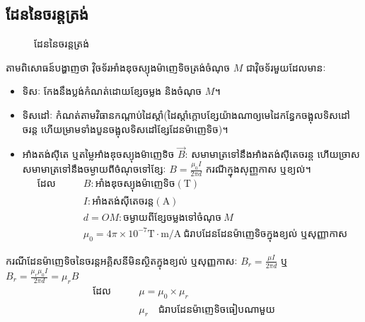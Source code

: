 \subsection{ដែននៃចរន្តត្រង់}
\begin{figure}[H]
	\centering
	\caption{ដែននៃចរន្តត្រង់}
\end{figure}
\quad តាមពិសោធន៍បង្ហាញថា វ៉ិចទ័រអាំងឌុចស្យុងម៉ាញេទិចត្រង់ចំណុច $M$ ជាវ៉ិចទ័រមួយដែលមានៈ
\begin{itemize}
	\item ទិសៈ កែងនឹងប្លង់កំណត់ដោយខ្សែចម្លង និងចំណុច $M$។
	\item ទិសដៅៈ កំណត់តាមវិធានកណ្តាប់ដៃស្តាំ(ដៃស្តាំក្តោបខ្សែយ៉ាងណាឲ្យមេដៃកន្ធែកចង្អុលទិសដៅចរន្ត ហើយម្រាមទាំងបួនចង្អុលទិសដៅខ្សែដែនម៉ាញេទិច)។
	\item អាំងតង់ស៊ីតេ ឬតម្លៃអាំងឌុចស្យុងម៉ាញេទិច $\vec{B}$: សមាមាត្រទៅនឹងអាំងតង់ស៊ីតេចរន្ត ហើយច្រាសសមាមាត្រទៅនឹងចម្ងាយពីចំណុចទៅខ្សែៈ $B=\frac{\mu_{0}I}{2\pi d}$ ករណីក្នុងសុញ្ញកាស ឬខ្យល់។
	\begin{align*}
		\text{ដែល}\quad &\quad B:\text{អាំងឌុចស្យុងម៉ាញេទិច}(\si{\tesla})\\
		\quad &\quad I:\text{អាំងតង់ស៊ីតេចរន្ត}(\si{\ampere})\\
		\quad &\quad d=OM:\text{ចម្ងាយពីខ្សែចម្លងទៅចំណុច}~M\\
		\quad &\quad \mu_{0}=4\pi\times10^{-7}\si{\tesla\cdot\metre/\ampere}~\text{ជំរាបដែនដែនម៉ាញេទិចក្នុងខ្យល់ ឬសុញ្ញាកាស}
	\end{align*}
\end{itemize}
\begin{remark}
	ករណីដែនម៉ាញេទិចនៃចរន្តអគ្គិសនីមិនស្ថិតក្នុងខ្យល់ ឬសុញ្ញកាសៈ $B_{r}=\frac{\mu I}{2\pi d}$ ឬ $B_{r}=\frac{\mu_{r}\mu_{0}I}{2\pi d}=\mu_{r}B$
	\begin{align*}
		\text{ដែល}\quad &\quad \mu=\mu_{0}\times \mu_{r}\\
		\quad &\quad \mu_{r}\quad \text{ជំរាបដែនម៉ាញេទិចធៀបណាមួយ}
	\end{align*}
\end{remark}
